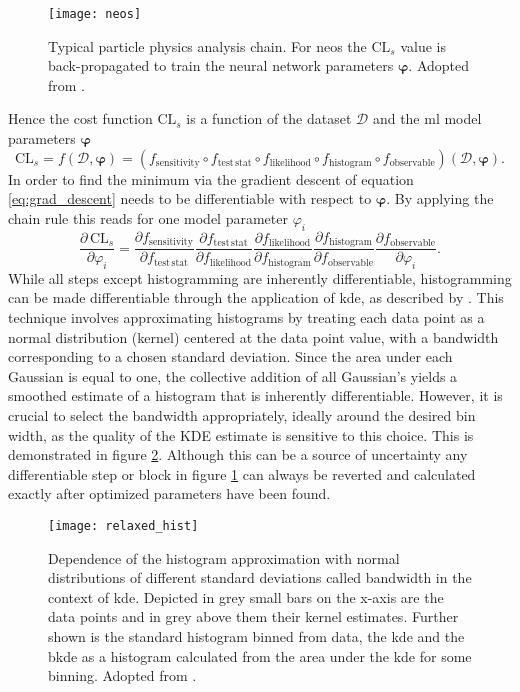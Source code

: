 \begin{figure}
    \centering
    \texttt{[image: neos]}
    \caption[]{Typical particle physics analysis chain. For \ac{neos} the $\text{CL}_s$ value is back-propagated to train the neural network parameters $\bm{\varphi}$. Adopted from \citep{Simpson_2023}.}
    \label{fig:neos}
\end{figure}
Hence the cost function $\text{CL}_s$ is a function of the dataset $\mathcal{D}$ and the \ac{ml} model parameters $\bm{\varphi}$
\begin{equation}
    \mathrm{CL}_s = f(\mathcal{D},\bm{\varphi}) = (f_{\mathrm{sensitivity}} \circ f_{\mathrm{test\,stat}} \circ f_{\mathrm{likelihood}}  \circ f_{\mathrm{histogram}}  \circ f_{\mathrm{observable}})(\mathcal{D},\bm{\varphi}).
\end{equation}
In order to find the minimum via the gradient descent of equation \ref{eq:grad_descent} \cls needs to be differentiable with respect to $\bm{\varphi}$. By applying the chain rule this reads for one model parameter $\varphi_i$
\begin{equation}
    \frac{\partial\,\mathrm{CL}_s}{\partial \varphi_i} = \frac{\partial f_{\mathrm{sensitivity}}}{\partial f_{\mathrm{test\,stat}}}\frac{\partial f_{\mathrm{test\,stat}}}{\partial f_{ \mathrm{likelihood}}} \frac{\partial f_{\mathrm{likelihood}}}{\partial f_{\mathrm{histogram}}}   \frac{\partial f_{\mathrm{histogram}}}{\partial f_{\mathrm{observable}}}  \frac{\partial f_{\mathrm{observable}}}{\partial \varphi_i}.
\end{equation}
While all steps except histogramming are inherently differentiable, histogramming can be made differentiable through the application of \ac{kde}, as described by \citep{CRANMER2001198}. This technique involves approximating histograms by treating each data point as a normal distribution (kernel) centered at the data point value, with a bandwidth corresponding to a chosen standard deviation. Since the area under each Gaussian is equal to one, the collective addition of all Gaussian's yields a smoothed estimate of a histogram that is inherently differentiable. However, it is crucial to select the bandwidth appropriately, ideally around the desired bin width, as the quality of the KDE estimate is sensitive to this choice. This is demonstrated in figure \ref{fig:relaxed_hist}. Although this can be a source of uncertainty any differentiable step or block in figure \ref{fig:neos} can always be reverted and calculated exactly after optimized parameters have been found.
\begin{figure}
    \centering
    \texttt{[image: relaxed\_hist]}
    \caption[]{Dependence of the histogram approximation with normal distributions of different standard deviations called bandwidth in the context of \ac{kde}. Depicted in grey small bars on the x-axis are the data points and in grey above them their kernel estimates. Further shown is the standard histogram binned from data, the \ac{kde} and the \ac{bkde} as a histogram calculated from the area under the \ac{kde} for some binning. Adopted from \citep{Simpson_2023}.}
    \label{fig:relaxed_hist}
\end{figure}



